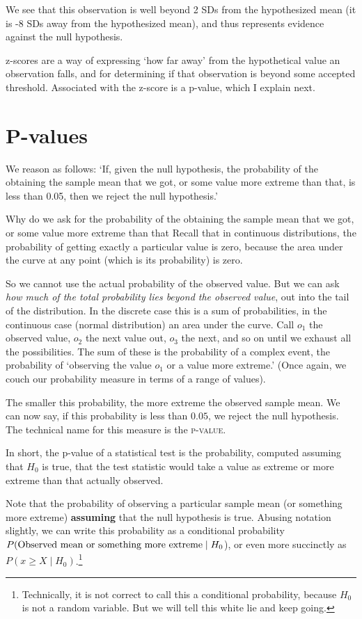 \documentclass[12pt]{book}\usepackage[]{graphicx}\usepackage[]{color}
\begin{document}
We see that this observation is well beyond 2 SDs from the hypothesized mean (it is -8 SDs away from the hypothesized mean), and thus represents evidence against the null hypothesis.

z-scores are a way of expressing `how far away' from the hypothetical value an observation falls, and for determining if that observation is beyond some accepted threshold. Associated with the z-score is a p-value, which I explain next.

\section{P-values} \label{pvals}

We reason as follows:
`If, given the null hypothesis, the probability of the obtaining the sample mean that we got, or some value more extreme than that, is less than 0.05, then we reject the null hypothesis.' 

Why do we ask for the probability of the obtaining the sample mean that we got, or some value more extreme than that
Recall that in continuous distributions, the probability of getting exactly a particular value is zero, because the area under the curve at any point (which is its probability) is zero. 

So we cannot use the actual probability of the observed value. But we can ask \emph{how much of
the total probability lies beyond the observed value}, out into the tail of the distribution. In the discrete case this is a sum of probabilities, in the continuous case (normal distribution) an area under the curve. Call $o_1$ the observed value, $o_2$ the next value out, $o_3$ the next, and so on until we exhaust all the possibilities. The sum of these is the probability of a complex event, the probability of `observing the value $o_1$ or a value more extreme.' (Once again, we couch our probability measure in terms of a range of values). 

The smaller this probability, the more extreme the observed sample mean.
We can now say, if this probability is less than $0.05$, we reject the null hypothesis. The technical name for this measure is the \textsc{p-value}.

In short, the p-value of a statistical test is the probability, computed assuming
that $H_0$ is true, that the test statistic would take a
value as extreme
or more extreme than that actually observed. 


\label{pvaluefallacy}
Note that the probability of observing a particular sample
mean (or something more extreme) \textbf{assuming} that
the null hypothesis is true. Abusing notation slightly, we can write this probability
as a conditional probability $P(\hbox{Observed mean or something more extreme}\mid H_0$), or even more succinctly as
$P(x\geq X   \mid H_0)$.\footnote{Technically, it is not correct to call this a conditional probability, because $H_0$ is not a random variable. But we will tell this white lie and keep going.} 
\end{document}
